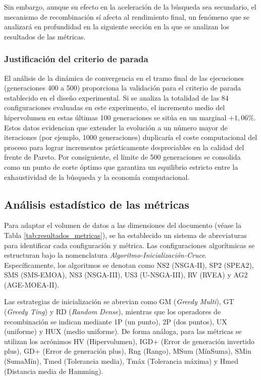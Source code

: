 Sin embargo, aunque su efecto en la aceleración de la búsqueda sea secundario, el mecanismo de recombinación sí afecta al rendimiento final, un fenómeno que se analizará en profundidad en la siguiente sección en la que se analizan los resultados de las métricas.

\subsubsection{Justificación del criterio de parada}

El análisis de la dinámica de convergencia en el tramo final de las ejecuciones (generaciones 400 a 500) proporciona la validación para el criterio de parada establecido en el diseño experimental. Si se analiza la totalidad de las 84 configuraciones evaluadas en este experimento, el incremento medio del hipervolumen en estas últimas 100 generaciones se sitúa en un marginal $+1{,}06\%$. Estos datos evidencian que extender la evolución a un número mayor de iteraciones (por ejemplo, 1000 generaciones) duplicaría el coste computacional del proceso para lograr incrementos prácticamente despreciables en la calidad del frente de Pareto. Por consiguiente, el límite de 500 generaciones se consolida como un punto de corte óptimo que garantiza un equilibrio estricto entre la exhaustividad de la búsqueda y la economía computacional.

\subsection{Análisis estadístico de las métricas}

Para adaptar el volumen de datos a las dimensiones del documento (véase la Tabla \ref{tab:resultados_metricas}), se ha establecido un sistema de abreviaturas para identificar cada configuración y métrica. Las configuraciones algorítmicas se estructuran bajo la nomenclatura \textit{Algoritmo-Inicialización-Cruce}. Específicamente, los algoritmos se denotan como NS2 (NSGA-II), SP2 (SPEA2), SMS (SMS-EMOA), NS3 (NSGA-III), US3 (U-NSGA-III), RV (RVEA) y AG2 (AGE-MOEA-II).

Las estrategias de inicialización se abrevian como GM (\textit{Greedy Multi}), GT (\textit{Greedy Ting}) y RD (\textit{Random Dense}), mientras que los operadores de recombinación se indican mediante 1P (un punto), 2P (dos puntos), UX (uniforme) y HUX (medio uniforme). De forma análoga, para las métricas se utilizan los acrónimos HV (Hipervolumen), IGD+ (Error de generación invertido plus), GD+ (Error de generación plus), Rng (Rango), MSum (MínSuma), SMin (SumaMín), Tmed (Tolerancia media), Tmáx (Tolerancia máxima) y Hmed (Distancia media de Hamming).

